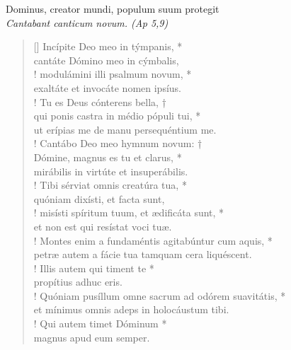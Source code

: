 


\def\greinitialformat#1{%
{\fontsize{39}{39}\selectfont #1}%
}




\vspace{0.3cm}
\begin{center}

Dominus, creator mundi, populum suum protegit\\
\textit{\small Cantabant canticum novum. (Ap 5,9)}
\end{center}
\begin{verse}[\versewidth]
Incípite Deo meo in týmpanis, *\\
cantáte Dómino meo in cýmbalis,\\!
\vin modulámini illi psalmum novum, *\\
\vin exaltáte et invocáte nomen ipsíus.\\!
Tu es Deus cónterens bella, †\\
qui ponis castra in médio pópuli tui, *\\
ut erípias me de manu persequéntium me.\\!
\vin Cantábo Deo meo hymnum novum: †\\
\vin Dómine, magnus es tu et clarus, *\\
\vin mirábilis in virtúte et insuperábilis.\\!
Tibi sérviat omnis creatúra tua, *\\
quóniam dixísti, et facta sunt,\\!
\vin misísti spíritum tuum, et ædificáta sunt, *\\
\vin et non est qui resístat voci tuæ.\\!
Montes enim a fundaméntis agitabúntur cum aquis, *\\
petræ autem a fácie tua tamquam cera liquéscent.\\!
\vin Illis autem qui timent te *\\
\vin propítius adhuc eris.\\!
Quóniam pusíllum omne sacrum ad odórem suavitátis, *\\
et mínimus omnis adeps in holocáustum tibi.\\!
\vin Qui autem timet Dóminum *\\
\vin magnus apud eum semper.\\
\end{verse}
\vspace{1cm}


